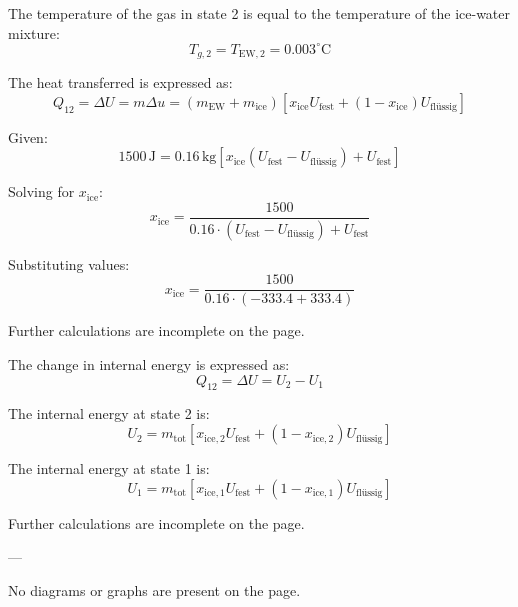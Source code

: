 The temperature of the gas in state 2 is equal to the temperature of the ice-water mixture:  
\[
T_{g,2} = T_{\text{EW},2} = 0.003^\circ \text{C}
\]  

The heat transferred is expressed as:  
\[
Q_{12} = \Delta U = m \Delta u = (m_{\text{EW}} + m_{\text{ice}}) \left[ x_{\text{ice}} U_{\text{fest}} + (1 - x_{\text{ice}}) U_{\text{flüssig}} \right]
\]  

Given:  
\[
1500 \, \text{J} = 0.16 \, \text{kg} \left[ x_{\text{ice}} (U_{\text{fest}} - U_{\text{flüssig}}) + U_{\text{fest}} \right]
\]  

Solving for \( x_{\text{ice}} \):  
\[
x_{\text{ice}} = \frac{1500}{0.16 \cdot (U_{\text{fest}} - U_{\text{flüssig}}) + U_{\text{fest}}}
\]  

Substituting values:  
\[
x_{\text{ice}} = \frac{1500}{0.16 \cdot (-333.4 + 333.4)}
\]  

Further calculations are incomplete on the page.  

The change in internal energy is expressed as:  
\[
Q_{12} = \Delta U = U_2 - U_1
\]  

The internal energy at state 2 is:  
\[
U_2 = m_{\text{tot}} \left[ x_{\text{ice},2} U_{\text{fest}} + (1 - x_{\text{ice},2}) U_{\text{flüssig}} \right]
\]  

The internal energy at state 1 is:  
\[
U_1 = m_{\text{tot}} \left[ x_{\text{ice},1} U_{\text{fest}} + (1 - x_{\text{ice},1}) U_{\text{flüssig}} \right]
\]  

Further calculations are incomplete on the page.  

---

No diagrams or graphs are present on the page.